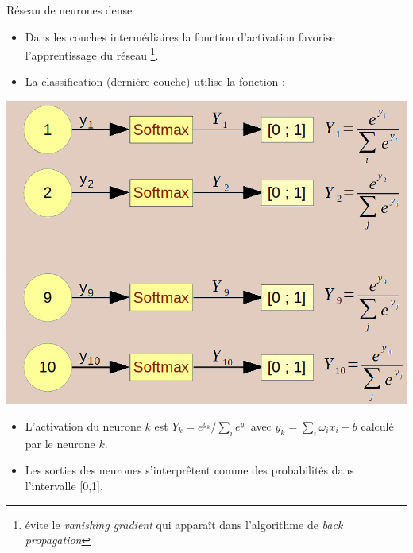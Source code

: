 \documentclass[10pt,serif,mathserif,compress,hyperref={colorlinks}]{beamer}
\begin{document}
\begin{frame}{Réseau de neurones dense}
  \vspace*{-2mm}

  \begin{itemize}
    
  \item Dans les couches intermédiaires la fonction d'activation  favorise l'apprentissage du réseau
    \footnote{{\tiny évite le {\em vanishing gradient} qui apparaît dans
        l'algorithme de {\em back propagation}}}.

  \item La classification (dernière couche) utilise la fonction  :

  \end{itemize}

    
  \begin{tcolorbox}[title=Fonction d'activation {\em softmax}]  

    \begin{minipage}{.45\textwidth}
      \hspace*{-5mm}\includegraphics[width=1.\textwidth]{images/softmax-2.png}
    \end{minipage}
    \begin{minipage}{.6\textwidth}
      {\small
        \begin{itemize}
        \item L'activation du neurone $k$ est $Y_k = e^{y_k}/\sum_i{e^{y_i}}$ 
          avec $y_k = \sum_i \omega_i x_i - b$ calculé par le neurone $k$.
        \item Les sorties des neurones s'interprêtent comme des probabilités dans l'intervalle [0,1].
        \end{itemize}
      }
    \end{minipage}
  \end{tcolorbox}

  \vspace*{-1mm}

\end{frame}
\end{document}
